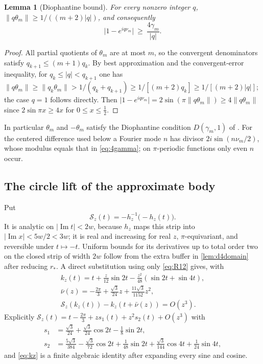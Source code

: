 \documentclass[11pt]{amsart}
\numberwithin{equation}{section}
\newtheorem{lemma}[theorem]{Lemma}
\theoremstyle{definition}
\theoremstyle{remark}
\newcommand{\abs}[1]{\lvert #1\rvert}
\newcommand{\norm}[1]{\lVert #1\rVert}
\begin{document}
\begin{lemma}[Diophantine bound]\label{lem:dioph4}
For every nonzero integer $q$, $\norm{q\theta_m}\ge1/((m+2)\abs q)$, and consequently
\begin{equation}\label{eq:4gamma}
\abs{1-e^{iq\nu_m}}\ \ge\ \frac{4\gamma_m}{\abs q}.
\end{equation}
\end{lemma}

\begin{proof}
All partial quotients of $\theta_m$ are at most $m$, so the convergent denominators satisfy $q_{k+1}\le(m+1)q_k$. By best approximation and the convergent-error inequality, for $q_k\le\abs q<q_{k+1}$ one has $\norm{q\theta_m}\ge\norm{q_k\theta_m}>1/(q_k+q_{k+1})\ge1/[(m+2)q_k]\ge1/[(m+2)\abs q]$; the case $q=1$ follows directly. Then $\abs{1-e^{iq\nu_m}}=2\sin(\pi\norm{q\theta_m})\ge4\norm{q\theta_m}$ since $2\sin\pi x\ge4x$ for $0\le x\le\frac12$.
\end{proof}

In particular $\theta_m$ and $-\theta_m$ satisfy the Diophantine condition $D(\gamma_m,1)$ of \cite{FHL}. For the centered difference used below a Fourier mode $n$ has divisor $2i\sin(n\nu_m/2)$, whose modulus equals that in \eqref{eq:4gamma}; on $\pi$-periodic functions only even $n$ occur.

\subsection{The circle lift of the approximate body}
Put
\begin{equation}\label{eq:sigmaz}
\mathcal S_z(t)=-h_z^{-1}\bigl(-h_z(t)\bigr).
\end{equation}
It is analytic on $\abs{\operatorname{Im}t}<2w$, because $h_z$ maps this strip into $\abs{\operatorname{Im}x}<5w/2<3w$; it is real and increasing for real $z$, $\pi$-equivariant, and reversible under $t\mapsto-t$. Uniform bounds for its derivatives up to total order two on the closed strip of width $2w$ follow from the extra buffer in \cref{lem:d4domain} after reducing $r_*$. A direct substitution using only \eqref{eq:R12} gives, with
\begin{equation}\label{eq:kz}
\begin{gathered}
k_z(t)=t+\tfrac z{12}\sin2t-\tfrac{z^2}{48}(\sin2t+\sin4t),\\ \bar\nu(z)=-\tfrac{2\pi}3+\tfrac{\sqrt3}{24}z+\tfrac{11\sqrt3}{1152}z^2,\\
\mathcal S_z(k_z(t))-k_z(t+\bar\nu(z))=O(z^3).
\end{gathered}
\end{equation}
Explicitly $\mathcal S_z(t)=t-\tfrac{2\pi}3+zs_1(t)+z^2s_2(t)+O(z^3)$ with
\begin{align*}
s_1&=\tfrac{\sqrt3}{24}+\tfrac{\sqrt3}{24}\cos2t-\tfrac18\sin2t,\\
s_2&=\tfrac{5\sqrt3}{384}-\tfrac{\sqrt3}{72}\cos2t+\tfrac1{48}\sin2t+\tfrac{\sqrt3}{144}\cos4t+\tfrac1{24}\sin4t,
\end{align*}
and \eqref{eq:kz} is a finite algebraic identity after expanding every sine and cosine.
\end{document}
